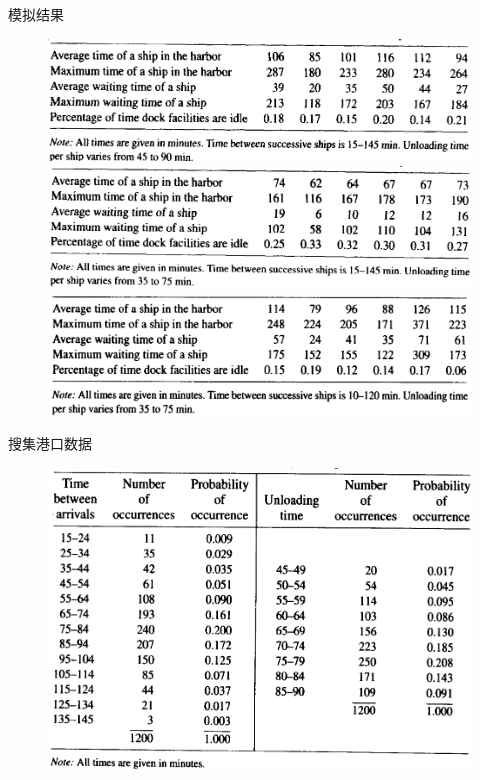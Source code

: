 \documentclass[mathserif, table]{beamer}
\begin{document}
\begin{frame}{模拟结果}

  \begin{figure}
    \centering
    \includegraphics[height=.25\textheight{}]{harbor-sim.png}\\
    \includegraphics[height=.25\textheight{}]{harbor-sim2.png}\\
    \includegraphics[height=.25\textheight{}]{harbor-sim3.png}
  \end{figure}
  
\end{frame}

\begin{frame}{搜集港口数据}
  \begin{figure}
    \centering
    \includegraphics[width=.8\textwidth{}]{harbor-real.png}
  \end{figure}
  
\end{frame}
\end{document}
